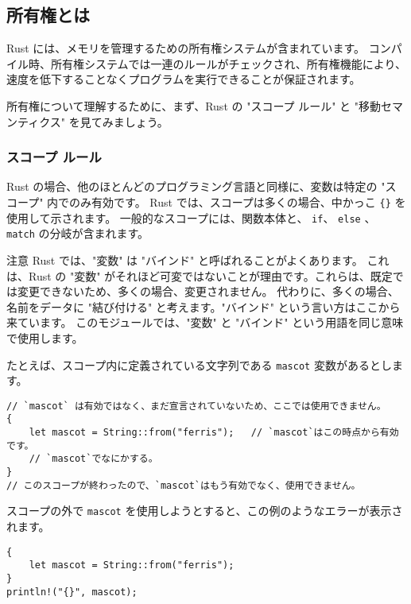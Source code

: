 \subsection{所有権とは}

Rust には、メモリを管理するための所有権システムが含まれています。 コンパイル時、所有権システムでは一連のルールがチェックされ、所有権機能により、速度を低下することなくプログラムを実行できることが保証されます。

所有権について理解するために、まず、Rust の "スコープ ルール" と "移動セマンティクス" を見てみましょう。

\subsubsection{スコープ ルール}

Rust の場合、他のほとんどのプログラミング言語と同様に、変数は特定の "スコープ" 内でのみ有効です。 Rust では、スコープは多くの場合、中かっこ \texttt{\{\}} を使用して示されます。 一般的なスコープには、関数本体と、 \texttt{if}、 \texttt{else} 、 \texttt{match} の分岐が含まれます。

\begin{itembox}[l]{注意}
Rust では、"変数" は "バインド" と呼ばれることがよくあります。 これは、Rust の "変数" がそれほど可変ではないことが理由です。これらは、既定では変更できないため、多くの場合、変更されません。 代わりに、多くの場合、名前をデータに "結び付ける" と考えます。"バインド" という言い方はここから来ています。 このモジュールでは、"変数" と "バインド" という用語を同じ意味で使用します。
\end{itembox}

たとえば、スコープ内に定義されている文字列である \texttt{mascot} 変数があるとします。

\begin{lstlisting}[numbers=none]
// `mascot` は有効ではなく、まだ宣言されていないため、ここでは使用できません。
{
    let mascot = String::from("ferris");   // `mascot`はこの時点から有効です。
    // `mascot`でなにかする。
}
// このスコープが終わったので、`mascot`はもう有効でなく、使用できません。
\end{lstlisting}

スコープの外で \texttt{mascot} を使用しようとすると、この例のようなエラーが表示されます。

\begin{lstlisting}[numbers=none]
{
    let mascot = String::from("ferris");
}
println!("{}", mascot);
\end{lstlisting}


